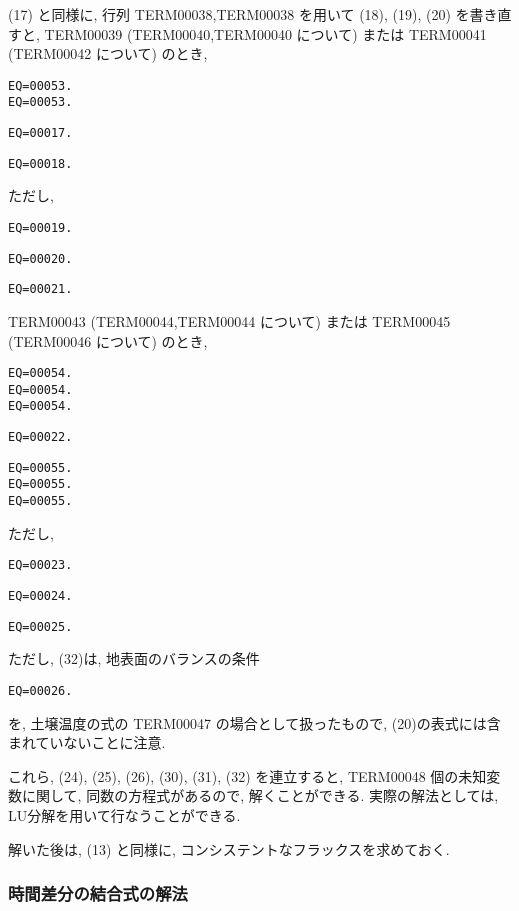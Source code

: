 (17) と同様に, 行列 TERM00038,TERM00038 を用いて
(18), (19), (20) を書き直すと, 
%
 TERM00039 (TERM00040,TERM00040 について) または TERM00041 (TERM00042 について) のとき, 
%
  \begin{verbatim}
EQ=00053.
EQ=00053.
\end{verbatim}

\begin{verbatim}
EQ=00017.
\end{verbatim}

\begin{verbatim}
EQ=00018.
\end{verbatim}
%
ただし, 
\begin{verbatim}
EQ=00019.
\end{verbatim}
\begin{verbatim}
EQ=00020.
\end{verbatim}
\begin{verbatim}
EQ=00021.
\end{verbatim}

 TERM00043 (TERM00044,TERM00044 について) または TERM00045 (TERM00046 について) のとき, 
%
  \begin{verbatim}
EQ=00054.
EQ=00054.
EQ=00054.
\end{verbatim}
%
\begin{verbatim}
EQ=00022.
\end{verbatim}
%
\begin{verbatim}
EQ=00055.
EQ=00055.
EQ=00055.
\end{verbatim}
%
ただし, 
\begin{verbatim}
EQ=00023.
\end{verbatim}
\begin{verbatim}
EQ=00024.
\end{verbatim}
\begin{verbatim}
EQ=00025.
\end{verbatim}
%
ただし, (32)は, 地表面のバランスの条件
\begin{verbatim}
EQ=00026.
\end{verbatim}
を, 土壌温度の式の TERM00047 の場合として扱ったもので, 
(20)の表式には含まれていないことに注意. 

これら,
(24), (25), (26), 
(30), (31), (32)
を連立すると, TERM00048 個の未知変数に関して, 
同数の方程式があるので, 解くことができる.
実際の解法としては, LU分解を用いて行なうことができる.

解いた後は, 
(13) と同様に,
コンシステントなフラックスを求めておく.

\subsubsection{時間差分の結合式の解法}

